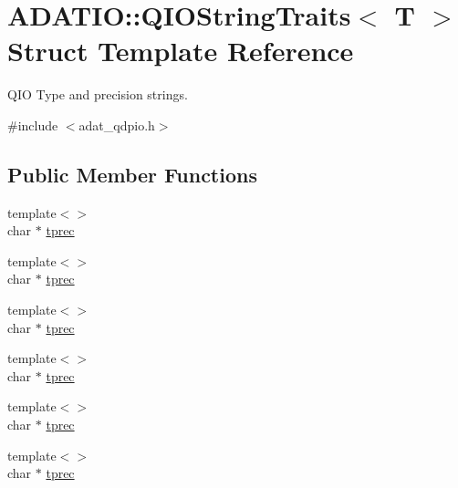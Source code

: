 \hypertarget{structADATIO_1_1QIOStringTraits}{}\section{A\+D\+A\+T\+IO\+:\+:Q\+I\+O\+String\+Traits$<$ T $>$ Struct Template Reference}
\label{structADATIO_1_1QIOStringTraits}


Q\+IO Type and precision strings.  




{\ttfamily \#include $<$adat\+\_\+qdpio.\+h$>$}

\subsection*{Public Member Functions}
\begin{DoxyCompactItemize}
\item 
{\footnotesize template$<$$>$ }\\char $\ast$ \mbox{\hyperlink{structADATIO_1_1QIOStringTraits_ad88615f93dbc104e55a88d6d166c86dc}{tprec}}
\item 
{\footnotesize template$<$$>$ }\\char $\ast$ \mbox{\hyperlink{structADATIO_1_1QIOStringTraits_a749439e4e624293716faa242eb63bc7c}{tprec}}
\item 
{\footnotesize template$<$$>$ }\\char $\ast$ \mbox{\hyperlink{structADATIO_1_1QIOStringTraits_ac52b79fcc02bc184bbc1fb50b7dbf30c}{tprec}}
\item 
{\footnotesize template$<$$>$ }\\char $\ast$ \mbox{\hyperlink{structADATIO_1_1QIOStringTraits_ad88615f93dbc104e55a88d6d166c86dc}{tprec}}
\item 
{\footnotesize template$<$$>$ }\\char $\ast$ \mbox{\hyperlink{structADATIO_1_1QIOStringTraits_a749439e4e624293716faa242eb63bc7c}{tprec}}
\item 
{\footnotesize template$<$$>$ }\\char $\ast$ \mbox{\hyperlink{structADATIO_1_1QIOStringTraits_ac52b79fcc02bc184bbc1fb50b7dbf30c}{tprec}}
\end{DoxyCompactItemize}
